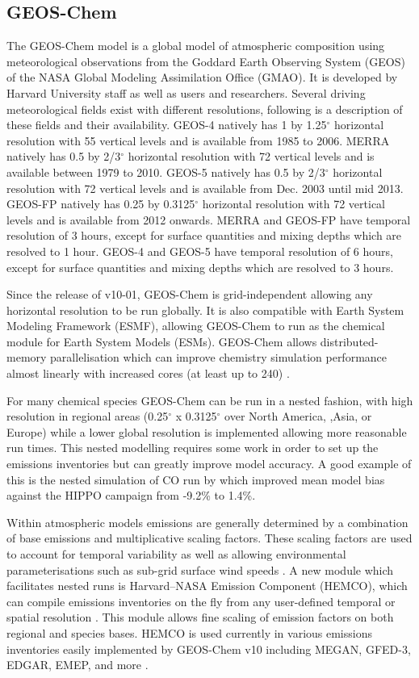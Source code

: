 \subsection{GEOS-Chem}

The GEOS-Chem model is a global model of atmospheric composition using meteorological observations from the Goddard Earth Observing System (GEOS) of the NASA Global Modeling Assimilation Office (GMAO). 
It is developed by Harvard University staff as well as users and researchers. 
Several driving meteorological fields exist with different resolutions, following is a description of these fields and their availability. 
GEOS-4 natively has 1 by 1.25$^\circ$ horizontal resolution with 55 vertical levels and is available from 1985 to 2006. 
MERRA natively has 0.5 by 2/3$^\circ$ horizontal resolution with 72 vertical levels and is available between 1979 to 2010.
GEOS-5 natively has 0.5 by 2/3$^\circ$ horizontal resolution with 72 vertical levels and is available from Dec. 2003 until mid 2013.
GEOS-FP natively has 0.25 by 0.3125$^\circ$ horizontal resolution with 72 vertical levels and is available from 2012 onwards.
MERRA and GEOS-FP have temporal resolution of 3 hours, except for surface quantities and mixing depths which are resolved to 1 hour.
GEOS-4 and GEOS-5 have temporal resolution of 6 hours, except for surface quantities and mixing depths which are resolved to 3 hours.

Since the release of v10-01, GEOS-Chem is grid-independent allowing any horizontal resolution to be run globally. 
It is also compatible with Earth System Modeling Framework (ESMF), allowing GEOS-Chem to run as the chemical module for Earth System Models (ESMs). 
GEOS-Chem allows distributed-memory parallelisation which can improve chemistry simulation performance almost linearly with increased cores (at least up to 240) \cite{Long_2015}.

For many chemical species GEOS-Chem can be run in a nested fashion, with high resolution in regional areas (0.25$^{\circ}$ x 0.3125$^{\circ}$ over North America, ,Asia, or Europe) while a lower global resolution is implemented allowing more reasonable run times.
This nested modelling requires some work in order to set up the emissions inventories but can greatly improve model accuracy.
A good example of this is the nested simulation of CO run by \citet{Yan_2014} which improved mean model bias against the HIPPO campaign from -9.2\% to 1.4\%.

Within atmospheric models emissions are generally determined by a combination of base emissions and multiplicative scaling factors. 
These scaling factors are used to account for temporal variability as well as allowing environmental parameterisations such as sub-grid surface wind speeds \cite{Ridley_2013,Zender_2003}.
A new module which facilitates nested runs is Harvard–NASA Emission Component (HEMCO), which can compile emissions inventories on the fly from any user-defined temporal or spatial resolution \cite{Keller_2014}.
This module allows fine scaling of emission factors on both regional and species bases.
HEMCO is used currently in various emissions inventories easily implemented by GEOS-Chem v10 including MEGAN, GFED-3, EDGAR, EMEP, and more \cite{Keller_2014}.
  
  
  
  
  